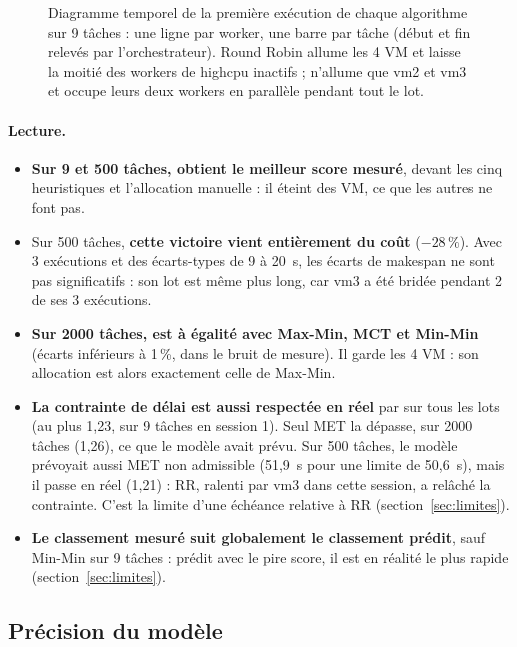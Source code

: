 \begin{figure}[H]
\centering

\caption{Diagramme temporel de la première exécution de chaque
algorithme sur 9 tâches : une ligne par worker, une barre par tâche (début et fin
relevés par l'orchestrateur). Round Robin allume les 4 VM et laisse la moitié des
workers de highcpu inactifs ; \sel{} n'allume que vm2 et vm3 et occupe leurs deux
workers en parallèle pendant tout le lot.}
\label{fig:gantt}
\end{figure}

\paragraph{Lecture.}
\begin{itemize}
  \item \textbf{Sur 9 et 500 tâches, \sel{} obtient le meilleur score mesuré},
        devant les cinq heuristiques et l'allocation manuelle : il éteint des VM,
        ce que les autres ne font pas.
  \item Sur 500 tâches, \textbf{cette victoire vient entièrement du coût}
        ($-28\,\%$). Avec 3 exécutions et des écarts-types de 9 à 20~s, les écarts
        de makespan ne sont pas significatifs : son lot est même plus long, car
        vm3 a été bridée pendant 2 de ses 3 exécutions.
  \item \textbf{Sur 2000 tâches, \sel{} est à égalité avec Max-Min, MCT et
        Min-Min} (écarts inférieurs à 1\,\%, dans le bruit de mesure). Il garde
        les 4 VM : son allocation est alors exactement celle de Max-Min.
  \item \textbf{La contrainte de délai est aussi respectée en réel} par \sel{} sur
        tous les lots (au plus 1,23, sur 9 tâches en session 1). Seul MET la
        dépasse, sur 2000 tâches (1,26), ce que le modèle avait prévu. Sur
        500 tâches, le modèle prévoyait aussi MET non admissible (51,9~s pour
        une limite de 50,6~s), mais il passe en réel (1,21) : RR, ralenti par
        vm3 dans cette session, a relâché la contrainte. C'est la limite d'une
        échéance relative à RR (section~\ref{sec:limites}).
  \item \textbf{Le classement mesuré suit globalement le classement prédit},
        sauf Min-Min sur 9 tâches : prédit avec le pire score, il est en réalité
        le plus rapide (section~\ref{sec:limites}).
\end{itemize}

\subsection{Précision du modèle}

